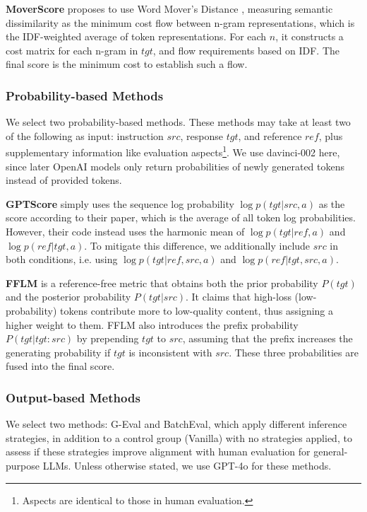 \textbf{MoverScore} \cite{DBLP:conf/emnlp/ZhaoPLGME19} proposes to use Word Mover's Distance \cite{DBLP:conf/icml/KusnerSKW15}, measuring semantic dissimilarity as the minimum cost flow between n-gram representations, which is the IDF-weighted average of token representations. For each \(n\), it constructs a cost matrix for each n-gram in \(tgt\), and flow requirements based on IDF. The final score is the minimum cost to establish such a flow.

\subsubsection{Probability-based Methods}
We select two probability-based methods. These methods may take at least two of the following as input: instruction \(src\), response \(tgt\), and reference \(ref\), plus supplementary information like evaluation aspects\footnote{Aspects are identical to those in human evaluation.}. We use davinci-002 here, since later OpenAI models only return probabilities of newly generated tokens instead of provided tokens.

\textbf{GPTScore} \cite{DBLP:conf/naacl/FuNJ024} simply uses the sequence log probability \(\log p(tgt|src,a)\) as the score according to their paper, which is the average of all token log probabilities. However, their code instead uses the harmonic mean of \(\log p(tgt|ref,a)\) and \(\log p(ref|tgt,a)\). To mitigate this difference, we additionally include \(src\) in both conditions, i.e. using \(\log p(tgt|ref,src,a)\) and \(\log p(ref|tgt,src,a)\).

\textbf{FFLM} \cite{DBLP:conf/emnlp/0003RLZ23} is a reference-free metric that obtains both the prior probability \(P(tgt)\) and the posterior probability \(P(tgt|src)\). It claims that high-loss (low-probability) tokens contribute more to low-quality content, thus assigning a higher weight to them. FFLM also introduces the prefix probability \(P(tgt|tgt:src)\) by prepending \(tgt\) to \(src\), assuming that the prefix increases the generating probability if \(tgt\) is inconsistent with \(src\). These three probabilities are fused into the final score.

\subsubsection{Output-based Methods}
We select two methods: G-Eval and BatchEval, which apply different inference strategies, in addition to a control group (Vanilla) with no strategies applied, to assess if these strategies improve alignment with human evaluation for general-purpose LLMs. Unless otherwise stated, we use GPT-4o for these methods.


